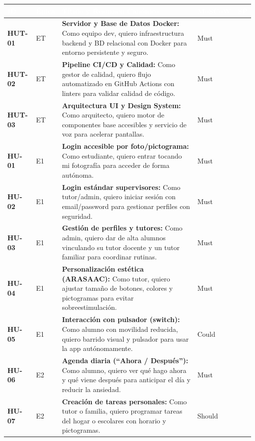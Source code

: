 \documentclass[11pt,a4paper]{article}
\begin{document}
{\small
\begin{longtable}{|>{\centering\bfseries\arraybackslash}p{1.3cm}|>{\centering\arraybackslash}p{1.1cm}|>{\raggedright\arraybackslash}p{7.4cm}|>{\centering\arraybackslash}p{1.6cm}|>{\centering\arraybackslash}p{0.8cm}|}
\hline
\rowcolor{gblue}\textcolor{white}{\textbf{ID}} & \textcolor{white}{\textbf{Épica}} & \textcolor{white}{\textbf{Título y Resumen Canónico}} & \textcolor{white}{\textbf{MoSCoW}} & \textcolor{white}{\textbf{SP}} \\ \hline
\endhead
HUT-01 & ET & \textbf{Servidor y Base de Datos Docker:} Como equipo dev, quiero infraestructura backend y BD relacional con Docker para entorno persistente y seguro. & Must & 3 \\ \hline
HUT-02 & ET & \textbf{Pipeline CI/CD y Calidad:} Como gestor de calidad, quiero flujo automatizado en GitHub Actions con linters para validar calidad de código. & Must & 2 \\ \hline
HUT-03 & ET & \textbf{Arquitectura UI y Design System:} Como arquitecto, quiero motor de componentes base accesibles y servicio de voz para acelerar pantallas. & Must & 3 \\ \hline
HU-01 & E1 & \textbf{Login accesible por foto/pictograma:} Como estudiante, quiero entrar tocando mi fotografía para acceder de forma autónoma. & Must & 3 \\ \hline
HU-02 & E1 & \textbf{Login estándar supervisores:} Como tutor/admin, quiero iniciar sesión con email/password para gestionar perfiles con seguridad. & Must & 2 \\ \hline
HU-03 & E1 & \textbf{Gestión de perfiles y tutores:} Como admin, quiero dar de alta alumnos vinculando su tutor docente y un tutor familiar para coordinar rutinas. & Must & 3 \\ \hline
HU-04 & E1 & \textbf{Personalización estética (ARASAAC):} Como tutor, quiero ajustar tamaño de botones, colores y pictogramas para evitar sobreestimulación. & Must & 3 \\ \hline
HU-05 & E1 & \textbf{Interacción con pulsador (switch):} Como alumno con movilidad reducida, quiero barrido visual y pulsador para usar la app autónomamente. & Could & 5 \\ \hline
HU-06 & E2 & \textbf{Agenda diaria (``Ahora / Después''):} Como alumno, quiero ver qué hago ahora y qué viene después para anticipar el día y reducir la ansiedad. & Must & 5 \\ \hline
HU-07 & E2 & \textbf{Creación de tareas personales:} Como tutor o familia, quiero programar tareas del hogar o escolares con horario y pictogramas. & Should & 3 \\ \hline

\end{longtable}}
\end{document}
